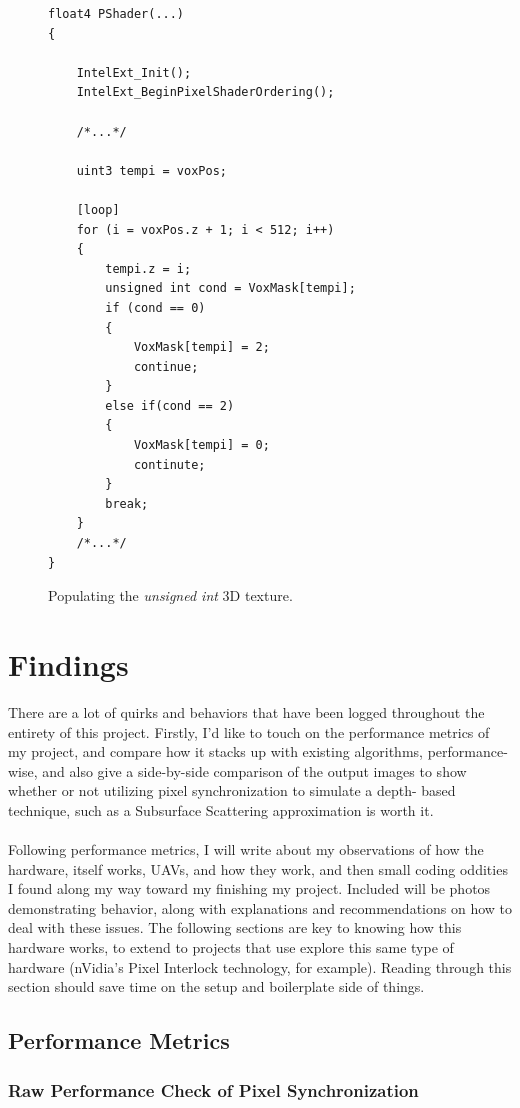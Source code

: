 \documentclass[a4paper, 12pt]{article}
\begin{document}
\begin{figure}[h]
\begin{lstlisting}[breaklines=true,language=HLSL]
float4 PShader(...)
{

	IntelExt_Init();
	IntelExt_BeginPixelShaderOrdering();

	/*...*/

	uint3 tempi = voxPos;

	[loop]
	for (i = voxPos.z + 1; i < 512; i++)
	{
		tempi.z = i;
		unsigned int cond = VoxMask[tempi];
		if (cond == 0)
		{
			VoxMask[tempi] = 2;
			continue;
		}
		else if(cond == 2)
		{
			VoxMask[tempi] = 0;
			continute;
		}
		break;
	}
	/*...*/
}
\end{lstlisting}
\caption{Populating the \textit{unsigned int} 3D texture.}
\label{code:3DTexPop}
\end{figure}

\section{Findings}

There are a lot of quirks and behaviors that have been logged throughout the
entirety of this project. Firstly, I'd like to touch on the performance
metrics of my project, and compare how it stacks up with existing algorithms,
performance-wise, and also give a side-by-side comparison of the output images
to show whether or not utilizing pixel synchronization to simulate a depth-
based technique, such as a Subsurface Scattering approximation is worth it. \\
\\ Following performance metrics, I will write about my observations of how
the hardware, itself works, UAVs, and how they work, and then small coding
oddities I found along my way toward my finishing my project. Included will be
photos demonstrating behavior, along with explanations and recommendations on
how to deal with these issues. The following sections are key to knowing how
this hardware works, to extend to projects that use explore this same type of
hardware (nVidia's Pixel Interlock technology, for example). Reading through
this section should save time on the setup and boilerplate side of things.

\subsection{Performance Metrics}
\label{section:findings}
\subsubsection{Raw Performance Check of Pixel Synchronization}
\end{document}
